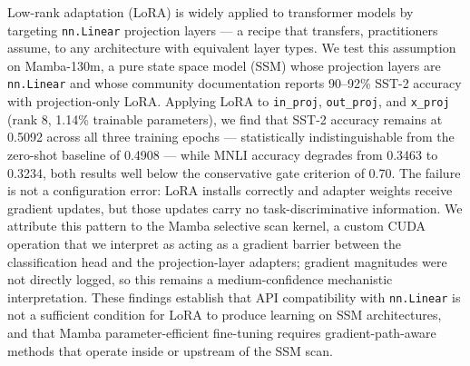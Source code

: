 Low-rank adaptation (LoRA) is widely applied to transformer models by targeting \texttt{nn.Linear} projection layers --- a recipe that transfers, practitioners assume, to any architecture with equivalent layer types.
We test this assumption on Mamba-130m, a pure state space model (SSM) whose projection layers are \texttt{nn.Linear} and whose community documentation reports 90--92\% SST-2 accuracy with projection-only LoRA.
Applying LoRA to \texttt{in\_proj}, \texttt{out\_proj}, and \texttt{x\_proj} (rank 8, 1.14\% trainable parameters), we find that SST-2 accuracy remains at 0.5092 across all three training epochs --- statistically indistinguishable from the zero-shot baseline of 0.4908 --- while MNLI accuracy degrades from 0.3463 to 0.3234, both results well below the conservative gate criterion of 0.70.
The failure is not a configuration error: LoRA installs correctly and adapter weights receive gradient updates, but those updates carry no task-discriminative information.
We attribute this pattern to the Mamba selective scan kernel, a custom CUDA operation that we interpret as acting as a gradient barrier between the classification head and the projection-layer adapters; gradient magnitudes were not directly logged, so this remains a medium-confidence mechanistic interpretation.
These findings establish that API compatibility with \texttt{nn.Linear} is not a sufficient condition for LoRA to produce learning on SSM architectures, and that Mamba parameter-efficient fine-tuning requires gradient-path-aware methods that operate inside or upstream of the SSM scan.
